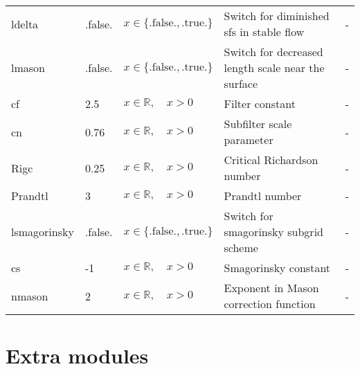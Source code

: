 \documentclass[twoside,11pt,fleqn,a4paper,english,openright]{report}
\begin{document}
\begin{center}
  \tablelasttail{
        &&&&\\\hline
  }
\begin{supertabular}{|l|p{1.6cm}|p{4cm}|p{6cm}|l|}
  ldelta	& .false.	& $x\in\{\text{.false.},\text{.true.}\}$	& Switch for diminished sfs in stable flow		& -\\
  lmason	& .false.	& $x\in\{\text{.false.},\text{.true.}\}$	& Switch for decreased length scale near the surface	& -\\
  cf		& 2.5		& $x \in \mathbb{R}, \quad x>0$	& Filter constant					& -\\
  cn		& 0.76		& $x \in \mathbb{R}, \quad x>0$	& Subfilter scale parameter				& -\\
  Rigc		& 0.25		& $x \in \mathbb{R}, \quad x>0$	& Critical Richardson number				& -\\
  Prandtl	& 3			& $x \in \mathbb{R}, \quad x>0$	& Prandtl number					& -\\
  lsmagorinsky & .false.& $x\in\{\text{.false.},\text{.true.}\}$	& Switch for smagorinsky subgrid scheme & -\\
  cs	& -1	& $x \in \mathbb{R}, \quad x>0$ & Smagorinsky constant	& -\\
  nmason	& 2	& $x \in \mathbb{R}, \quad x>0$ & Exponent in Mason correction function & -\\
\end{supertabular}
\end{center}

\newpage
\section{Extra modules}\label{par:extramod}
\end{document}
